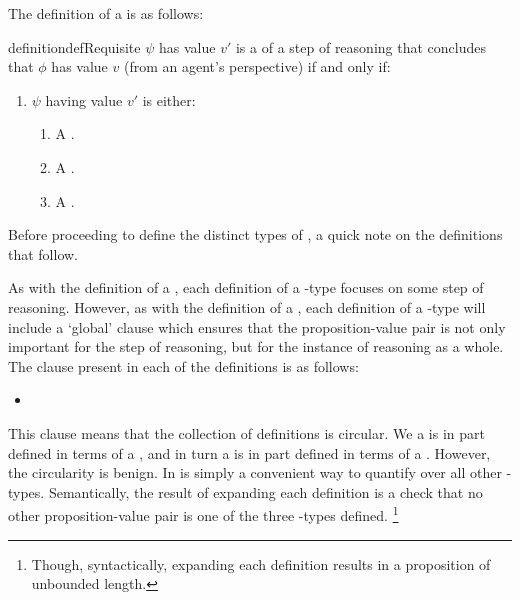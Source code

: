 \begin{note}
  The definition of a \requ{} is as follows:
  \begin{restatable}{definition}{defRequisite}
    \label{def:requsite}
    \(\psi\) has value \(v'\) is a \emph{\requ{}} of a step of reasoning that concludes that \(\phi\) has value \(v\) (from an agent's perspective) if and only if:
    \begin{enumerate}[label=\arabic*., ref=\named{R:\arabic*}]
    \item[] \(\psi\) having value \(v'\) is either:
      \begin{enumerate}
      \item
        A \prequ{}.
      \item
        A \crequ{}.
      \item
        A \cprequ{}.
      \end{enumerate}
      \vspace{-\baselineskip}
    \end{enumerate}
    \vspace{-\baselineskip}
  \end{restatable}
\end{note}

\begin{note}
  Before proceeding to define the distinct types of \requ{}, a quick note on the definitions that follow.

  As with the definition of a \result{}, each definition of a \requ{}-type focuses on some step of reasoning.
  However, as with the definition of a \result{}, each definition of a \requ{}-type will include a `global' clause which ensures that the proposition-value pair is not only important for the step of reasoning, but for the instance of reasoning as a whole.
  The clause present in each of the definitions is as follows:
  \begin{itemize}
  \item
    \requGlobalClause{}
  \end{itemize}
  This clause means that the collection of definitions is circular.
  We a \requ{} is in part defined in terms of a \prequ{}, and in turn a \prequ{} is in part defined in terms of a \requ{}.
  However, the circularity is benign.
  In is simply a convenient way to quantify over all other \requ{}-types.
  Semantically, the result of expanding each definition is a check that no other proposition-value pair is one of the three \requ{}-types defined.\nolinebreak
  \footnote{
    Though, syntactically, expanding each definition results in a proposition of unbounded length.
  }
\end{note}

